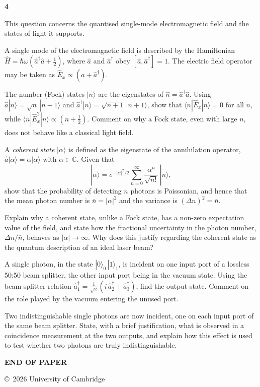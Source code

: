 \documentclass[11pt]{article}
\newcommand{\qmarks}[1]{\hfill\makebox[0pt][r]{\hspace{1.5em}\textbf{[#1]}}}
\newcounter{question}
\newcommand{\question}{\par\vspace{4pt}\refstepcounter{question}%
  \noindent\makebox[1.6em][l]{\textbf{\thequestion}}}
\begin{document}
\newpage
\begin{center}\textbf{4}\end{center}

\question
This question concerns the quantised single-mode electromagnetic field and the
states of light it supports.

A single mode of the electromagnetic field is described by the Hamiltonian
$\hat{H} = \hbar\omega(\hat{a}^{\dagger}\hat{a} + \tfrac12)$, where $\hat{a}$
and $\hat{a}^{\dagger}$ obey $[\hat{a},\hat{a}^{\dagger}] = 1$. The electric
field operator may be taken as
$\hat{E}_x \propto (\hat{a} + \hat{a}^{\dagger})$.

\begin{parts}

\item The number (Fock) states $|n\rangle$ are the eigenstates of
$\hat{n} = \hat{a}^{\dagger}\hat{a}$. Using
$\hat{a}|n\rangle = \sqrt{n}\,|n-1\rangle$ and
$\hat{a}^{\dagger}|n\rangle = \sqrt{n+1}\,|n+1\rangle$, show that
$\langle n|\hat{E}_x|n\rangle = 0$ for all $n$, while
$\langle n|\hat{E}_x^{2}|n\rangle \propto (n + \tfrac12)$. Comment on why a
Fock state, even with large $n$, does not behave like a classical light field.
\qmarks{5}

\item A \textit{coherent state} $|\alpha\rangle$ is defined as the eigenstate of
the annihilation operator, $\hat{a}|\alpha\rangle = \alpha|\alpha\rangle$ with
$\alpha\in\mathbb{C}$. Given that
\[
  |\alpha\rangle = e^{-|\alpha|^{2}/2}\sum_{n=0}^{\infty}
  \frac{\alpha^{n}}{\sqrt{n!}}\,|n\rangle,
\]
show that the probability of detecting $n$ photons is Poissonian, and hence
that the mean photon number is $\bar{n} = |\alpha|^{2}$ and the variance is
$(\Delta n)^{2} = \bar{n}$.
\qmarks{5}

\item Explain why a coherent state, unlike a Fock state, has a non-zero
expectation value of the field, and state how the fractional uncertainty in the
photon number, $\Delta n/\bar{n}$, behaves as $|\alpha| \to \infty$. Why does
this justify regarding the coherent state as the quantum description of an
ideal laser beam?
\qmarks{4}

\item A single photon, in the state $|0\rangle_{0}\,|1\rangle_{1}$, is incident
on one input port of a lossless 50:50 beam splitter, the other input port being
in the vacuum state. Using the beam-splitter relation
$\hat{a}^{\dagger}_{1} = \tfrac{1}{\sqrt2}
(i\,\hat{a}^{\dagger}_{2} + \hat{a}^{\dagger}_{3})$,
find the output state. Comment on the role played by the vacuum entering the
unused port.
\qmarks{3}

\item Two indistinguishable single photons are now incident, one on each input
port of the same beam splitter. State, with a brief justification, what is
observed in a coincidence measurement at the two outputs, and explain how this
effect is used to test whether two photons are truly indistinguishable.
\qmarks{3}

\end{parts}

\vspace{1.2cm}
\begin{center}\textbf{END OF PAPER}\end{center}

\thispagestyle{empty}
\vfill
\noindent\copyright\ 2026 University of Cambridge
\end{document}
